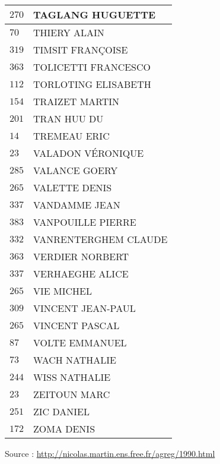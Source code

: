 \begin{xltabular}{\linewidth}{|l|X|}
    \hline
    $270$ & TAGLANG HUGUETTE \\
    \hline
    $70$ & THIERY ALAIN \\
    \hline
    $319$ & TIMSIT FRANÇOISE \\
    \hline
    $363$ & TOLICETTI FRANCESCO \\
    \hline
    $112$ & TORLOTING ELISABETH \\
    \hline
    $154$ & TRAIZET MARTIN \\
    \hline
    $201$ & TRAN HUU DU \\
    \hline
    $14$ & TREMEAU ERIC \\
    \hline
    $23$ & VALADON VÉRONIQUE \\
    \hline
    $285$ & VALANCE GOERY \\
    \hline
    $265$ & VALETTE DENIS \\
    \hline
    $337$ & VANDAMME JEAN \\
    \hline
    $383$ & VANPOUILLE PIERRE \\
    \hline
    $332$ & VANRENTERGHEM CLAUDE \\
    \hline
    $363$ & VERDIER NORBERT \\
    \hline
    $337$ & VERHAEGHE ALICE \\
    \hline
    $265$ & VIE MICHEL \\
    \hline
    $309$ & VINCENT JEAN-PAUL \\
    \hline
    $265$ & VINCENT PASCAL \\
    \hline
    $87$ & VOLTE EMMANUEL \\
    \hline
    $73$ & WACH NATHALIE \\
    \hline
    $244$ & WISS NATHALIE \\
    \hline
    $23$ & ZEITOUN MARC \\
    \hline
    $251$ & ZIC DANIEL \\
    \hline
    $172$ & ZOMA DENIS \\
    \hline
  \end{xltabular}

  \begin{flushright}
    {\tiny Source : \url{http://nicolas.martin.ens.free.fr/agreg/1990.html}}
  \end{flushright}

